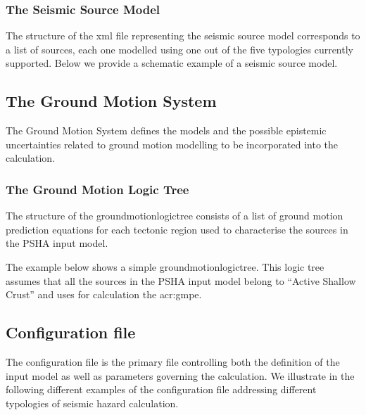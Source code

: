 \subsubsection{The Seismic Source Model}
The structure of the xml file representing the seismic source 
model corresponds to a list of sources, each one modelled using 
one out of the five typologies currently supported.
Below we provide a schematic example of a seismic source model.

%
\subsection{The Ground Motion System}
The Ground Motion System defines the models and the possible epistemic 
uncertainties related to ground motion modelling to be incorporated 
into the calculation.
%
\subsubsection{The Ground Motion Logic Tree}
\label{ref:gmlt_example}
The structure of the \gls{groundmotionlogictree} consists of a list 
of ground motion prediction equations for each tectonic region used to
characterise the sources in the PSHA input model.

The example below shows a simple \gls{groundmotionlogictree}. 
This logic tree assumes that all the sources in the PSHA input model 
belong to ``Active Shallow Crust'' and uses for calculation the 
\citet{chiou2008} \gls{acr:gmpe}.

%
\subsection{Configuration file}
\label{sec:conf_file}
The configuration file is the primary file controlling both the 
definition of the input model as well as parameters governing the 
calculation. We illustrate in the following different examples of 
the configuration file addressing different typologies of seismic 
hazard calculation.



